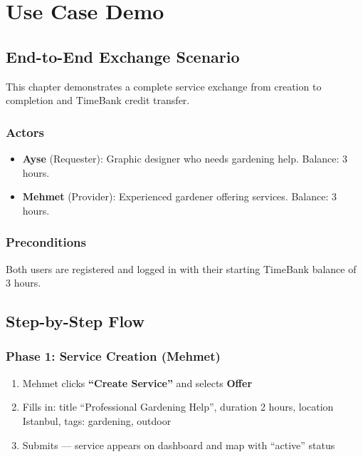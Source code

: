 \documentclass[10pt,a4paper]{report}
\begin{document}
\chapter{Use Case Demo}
\label{chap:usecase}

\section{End-to-End Exchange Scenario}

This chapter demonstrates a complete service exchange from creation to completion and TimeBank credit transfer.

\subsection{Actors}

\begin{itemize}
    \item \textbf{Ayse} (Requester): Graphic designer who needs gardening help. Balance: 3 hours.
    \item \textbf{Mehmet} (Provider): Experienced gardener offering services. Balance: 3 hours.
\end{itemize}

\subsection{Preconditions}

Both users are registered and logged in with their starting TimeBank balance of 3 hours.

\section{Step-by-Step Flow}

\subsection{Phase 1: Service Creation (Mehmet)}

\begin{enumerate}
    \item Mehmet clicks \textbf{``Create Service''} and selects \textbf{Offer}
    \item Fills in: title ``Professional Gardening Help'', duration 2 hours, location Istanbul, tags: gardening, outdoor
    \item Submits --- service appears on dashboard and map with ``active'' status
\end{enumerate}
\end{document}
